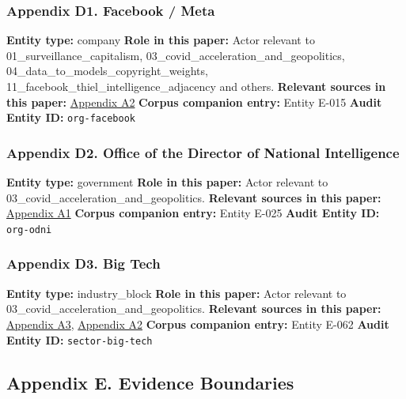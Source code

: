 \documentclass[
  american,
  11pt,
  letterpaper,
]{article}
\begin{document}
\subsubsection{Appendix D1. Facebook /
Meta}\label{ch-03-appendix-d1-facebook-meta}

\textbf{Entity type:} company \textbf{Role in this paper:} Actor
relevant to 01\_surveillance\_capitalism,
03\_covid\_acceleration\_and\_geopolitics,
04\_data\_to\_models\_copyright\_weights,
11\_facebook\_thiel\_intelligence\_adjacency and others.
\textbf{Relevant sources in this paper:}
\hyperref[ch-03-appendix-a2-big-tech-announces-striking-pandemic-gains-as-small-businesses-strain-to-find-their-footing]{Appendix
A2} \textbf{Corpus companion entry:} Entity E-015 \textbf{Audit Entity
ID:} \texttt{org-facebook}

\subsubsection{Appendix D2. Office of the Director of National
Intelligence}\label{ch-03-appendix-d2-office-of-the-director-of-national-intelligence}

\textbf{Entity type:} government \textbf{Role in this paper:} Actor
relevant to 03\_covid\_acceleration\_and\_geopolitics. \textbf{Relevant
sources in this paper:}
\hyperref[ch-03-appendix-a1-report-on-potential-links-between-the-wuhan-institute-of-virology-and-the-origins-of-covid-19]{Appendix
A1} \textbf{Corpus companion entry:} Entity E-025 \textbf{Audit Entity
ID:} \texttt{org-odni}

\subsubsection{Appendix D3. Big Tech}\label{ch-03-appendix-d3-big-tech}

\textbf{Entity type:} industry\_block \textbf{Role in this paper:} Actor
relevant to 03\_covid\_acceleration\_and\_geopolitics. \textbf{Relevant
sources in this paper:}
\hyperref[ch-03-appendix-a3-pandemic-provides-a-techlash-reprieve]{Appendix
A3},
\hyperref[ch-03-appendix-a2-big-tech-announces-striking-pandemic-gains-as-small-businesses-strain-to-find-their-footing]{Appendix
A2} \textbf{Corpus companion entry:} Entity E-062 \textbf{Audit Entity
ID:} \texttt{sector-big-tech}

\subsection{Appendix E. Evidence
Boundaries}\label{appendix-e.-evidence-boundaries-3}
\end{document}
